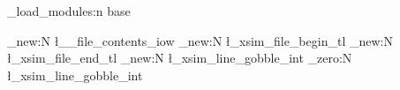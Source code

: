 % 
% 
% 
% 
% 

\xsim_load_modules:n {base}

\iow_new:N  \l__file_contents_iow
\tl_new:N   \l_xsim_file_begin_tl
\tl_new:N   \l_xsim_file_end_tl
\int_new:N  \l_xsim_line_gobble_int
\int_zero:N \l_xsim_line_gobble_int

